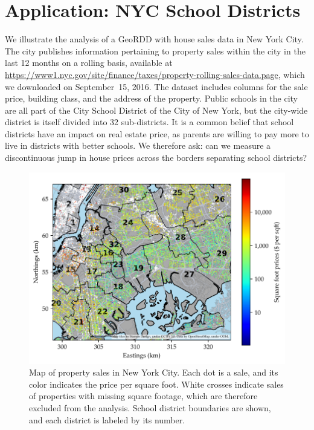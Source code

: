 \section{Application: NYC School Districts}
\label{sec:NYC_example}

We illustrate the analysis of a GeoRDD with house sales data in New York City.
The city publishes information pertaining to property sales within the city in the last 12 months on a rolling basis,
available at \url{https://www1.nyc.gov/site/finance/taxes/property-rolling-sales-data.page},
which we downloaded on September~15, 2016.
The dataset includes columns for the sale price, building class, and the address of the property.
Public schools in the city are all part of the City School District of the City of New York, but the city-wide district is itself divided into 32 sub-districts.
It is a common belief that school districts have an impact on real estate price, as parents are willing to pay more to live in districts with better schools.
We therefore ask: can we measure a discontinuous jump in house prices across the borders separating school districts?

\begin{figure}[tb]
    \centering
    \includegraphics[width=\textwidth,height=0.4\textheight,keepaspectratio]{figures/sales_map.pdf}
    \caption{\label{fig:sales_map}Map of property sales in New York City. Each dot is a sale, and its color indicates the price per square foot. White crosses indicate sales of properties with missing square footage, which are therefore excluded from the analysis. School district boundaries are shown, and each district is labeled by its number.}
\end{figure}

